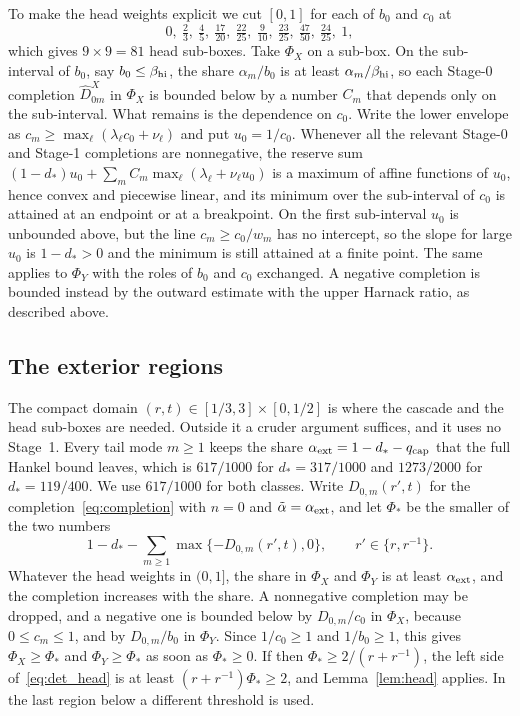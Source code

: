 \documentclass[10pt]{article}
\theoremstyle{remark}
\newcommand{\dstar}{d_{*}}
\begin{document}
To make the head weights explicit we cut $[0,1]$ for each of $b_0$ and $c_0$ at
\[
0,\ \tfrac23,\ \tfrac45,\ \tfrac{17}{20},\ \tfrac{22}{25},\ \tfrac9{10},\ \tfrac{23}{25},\ \tfrac{47}{50},\ \tfrac{24}{25},\ 1,
\]
which gives $9\times9=81$ head sub-boxes. Take $\Phi_X$ on a sub-box. On the sub-interval of $b_0$, say $b_0\le\beta_{\rm hi}$, the share $\alpha_m/b_0$ is at least $\alpha_m/\beta_{\rm hi}$, so each Stage-0 completion $\hat D^X_{0m}$ in $\Phi_X$ is bounded below by a number $C_m$ that depends only on the sub-interval. What remains is the dependence on $c_0$. Write the lower envelope as $c_m\ge\max_\ell(\lambda_\ell c_0+\nu_\ell)$ and put $u_0=1/c_0$. Whenever all the relevant Stage-0 and Stage-1 completions are nonnegative, the reserve sum $(1-\dstar)u_0+\sum_mC_m\max_\ell(\lambda_\ell+\nu_\ell u_0)$ is a maximum of affine functions of $u_0$, hence convex and piecewise linear, and its minimum over the sub-interval of $c_0$ is attained at an endpoint or at a breakpoint. On the first sub-interval $u_0$ is unbounded above, but the line $c_m\ge c_0/w_m$ has no intercept, so the slope for large $u_0$ is $1-\dstar>0$ and the minimum is still attained at a finite point. The same applies to $\Phi_Y$ with the roles of $b_0$ and $c_0$ exchanged. A negative completion is bounded instead by the outward estimate with the upper Harnack ratio, as described above.

\subsection{The exterior regions}

The compact domain $(r,t)\in[1/3,3]\times[0,1/2]$ is where the cascade and the head sub-boxes are needed. Outside it a cruder argument suffices, and it uses no Stage~1. Every tail mode $m\ge1$ keeps the share $\alpha_{\rm ext}=1-\dstar-q_{\rm cap}$ that the full Hankel bound leaves, which is $617/1000$ for $\dstar=317/1000$ and $1273/2000$ for $\dstar=119/400$. We use $617/1000$ for both classes. Write $D_{0,m}(r',t)$ for the completion~\eqref{eq:completion} with $n=0$ and $\tilde\alpha=\alpha_{\rm ext}$, and let $\Phi_*$ be the smaller of the two numbers
\[
1-\dstar-\sum_{m\ge1}\max\{-D_{0,m}(r',t),0\},\qquad r'\in\{r,r^{-1}\}.
\]
Whatever the head weights in $(0,1]$, the share in $\Phi_X$ and $\Phi_Y$ is at least $\alpha_{\rm ext}$, and the completion increases with the share. A nonnegative completion may be dropped, and a negative one is bounded below by $D_{0,m}/c_0$ in $\Phi_X$, because $0\le c_m\le1$, and by $D_{0,m}/b_0$ in $\Phi_Y$. Since $1/c_0\ge1$ and $1/b_0\ge1$, this gives $\Phi_X\ge\Phi_*$ and $\Phi_Y\ge\Phi_*$ as soon as $\Phi_*\ge0$. If then $\Phi_*\ge2/(r+r^{-1})$, the left side of~\eqref{eq:det_head} is at least $(r+r^{-1})\Phi_*\ge2$, and Lemma~\ref{lem:head} applies. In the last region below a different threshold is used.
\end{document}
